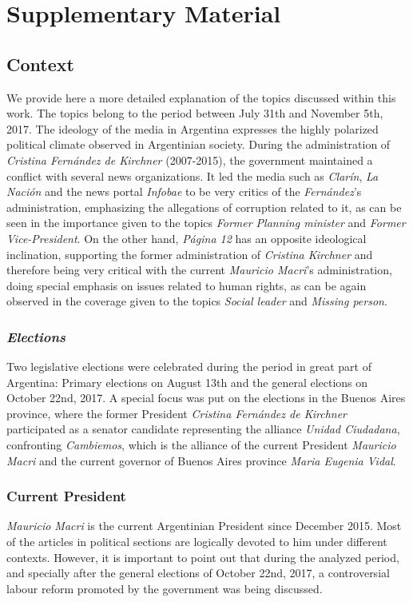\documentclass{bmcart}
\begin{document}
\newpage
\section*{Supplementary Material}
\subsection*{Context}
\label{sec:Context}

\par We provide here a more detailed explanation of the topics discussed within this work. The topics belong to the period between July 31th and November 5th, 2017.
The ideology of the media in Argentina expresses the highly polarized political climate observed in Argentinian society.
During the administration of \emph{Cristina Fern\'andez de Kirchner} (2007-2015), the government maintained a conflict with several news organizations.
It led the media such as \emph{Clar\'in}, \emph{La Naci\'on} and the news portal \emph{Infobae} to be very critics of the \emph{Fern\'andez}'s administration, emphasizing the allegations of corruption related to it, as can be seen in the importance given to the topics \emph{Former Planning minister} and \emph{Former Vice-President}.
On the other hand, \emph{P\'agina 12} has an opposite ideological inclination, supporting the former administration of \emph{Cristina Kirchner} and therefore being very critical with the current \emph{Mauricio Macri}'s administration, doing special emphasis on issues related to human rights, as can be again observed in the coverage given to the topics \emph{Social leader} and \emph{Missing person}.

\subsubsection*{\emph{Elections}}
\par Two legislative elections were celebrated during the period in great part of Argentina: Primary elections on August 13th and the general elections on October 22nd, 2017. 
A special focus was put on the elections in the Buenos Aires province, where the former President \emph{Cristina Fern\'andez de Kirchner} participated as a senator candidate representing the alliance \emph{Unidad Ciudadana}, confronting \emph{Cambiemos}, which is the alliance of the current President \emph{Mauricio Macri} and the current governor of Buenos Aires province \emph{Maria Eugenia Vidal}.
 
\subsubsection*{Current President}
\par \emph{Mauricio Macri} is the current Argentinian President since December 2015. 
Most of the articles in political sections are logically devoted to him under different contexts.
However, it is important to point out that during the analyzed period, and specially after the general elections of October 22nd, 2017, a controversial labour reform promoted by the government was being discussed.
\end{document}

